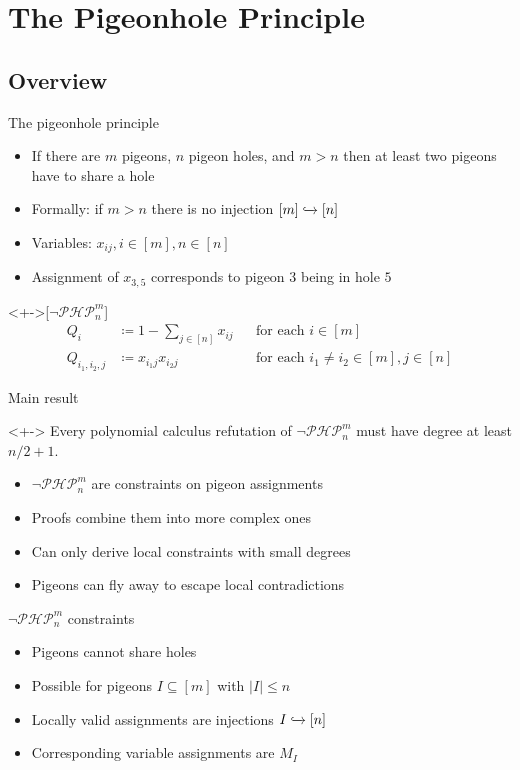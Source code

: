 \documentclass[xcolor={dvipsnames}, aspectratio=169]{beamer}
\newcommand{\PHP}{\ensuremath{\neg \mathcal{PHP}^m_n}\xspace}
\newcommand{\Qiij}{Q_{i_1, i_2, j}}
\begin{document}
\section{The Pigeonhole Principle}
\subsection{Overview}
\begin{frame}{The pigeonhole principle}
    \begin{itemize}[<+->]
        \item If there are $m$ pigeons, $n$ pigeon holes, and $m > n$ then at least two pigeons have to share a hole
        \item Formally: if $m > n$ there is no injection $[m] \xhookrightarrow{} [n]$
        \item Variables: $x_{i j}, i \in [m], n \in [n]$
        \item Assignment of $x_{3, 5}$ corresponds to pigeon $3$ being in hole $5$
    \end{itemize}
    \begin{definition}<+->[\PHP]
        \begin{align*}
            Q_i &\coloneqq 1 - \sum_{j \in [n]} x_{ij} &&\text{for each $i \in [m]$}\\
            \Qiij &\coloneqq x_{i_1j} x_{i_2j} &&\text{for each $i_1 \neq i_2 \in [m], j \in [n]$}
        \end{align*}
    \end{definition}
\end{frame}

\begin{frame}{Main result}
    \begin{theorem}<+->
        Every polynomial calculus refutation of \PHP must have degree at least $n/2 + 1$.
    \end{theorem}
    \begin{itemize}[<+->]
        \item \PHP are constraints on pigeon assignments
        \item Proofs combine them into more complex ones
        \item Can only derive local constraints with small degrees
        \item Pigeons can fly away to escape local contradictions
    \end{itemize}
\end{frame}

\begin{frame}{\PHP constraints}
    \begin{itemize}[<+->]
        \item Pigeons cannot share holes
        \item Possible for pigeons $I \subseteq [m]$ with $|I| \leq n$
        \item Locally valid assignments are injections $I \xhookrightarrow{} [n]$
        \item Corresponding variable assignments are $M_I$
    \end{itemize}
\end{frame}
\end{document}
